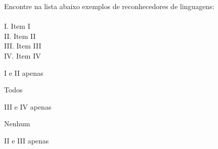 \question[10]
Encontre na lista abaixo exemplos de reconhecedores de linguagens:\\
\\
I. Item I\\
II. Item II\\
III. Item III\\
IV. Item IV
\\
\begin{choices}
\item I e II apenas
\item Todos
\item III e IV apenas
\item Nenhum %
\item II e III apenas
\end{choices}
\answerline

